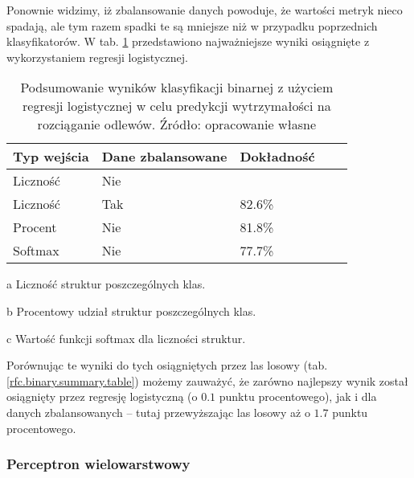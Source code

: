 Ponownie widzimy, iż zbalansowanie danych powoduje, że wartości metryk nieco spadają, ale tym razem spadki te są mniejsze niż w przypadku poprzednich klasyfikatorów. W tab. \ref{logit.binary.summary.table} przedstawiono najważniejsze wyniki osiągnięte z wykorzystaniem regresji logistycznej.
\begin{table}[!h]
	\centering
	\begin{threeparttable}
		\caption{Podsumowanie wyników klasyfikacji binarnej z użyciem regresji logistycznej w celu predykcji wytrzymałości na rozciąganie odlewów. Źródło: opracowanie własne}
		\label{logit.binary.summary.table}
		\begin{tabularx}{1\textwidth}{ |X|X|X|X|X| }
		  \hline
		  \textbf{Typ wejścia} & \textbf{Dane zbalansowane} & \textbf{Dokładność}\\

		  \hline
		  Liczność\tnote{a} & Nie  & \bo{83.1\%} \\

		  \hline
		  Liczność & Tak & 82.6\%\\

		  \hline
  		  Procent\tnote{b} & Nie & 81.8\%\\

	          \hline
  		  Softmax\tnote{c} & Nie & 77.7\%\\

		  \hline
		\end{tabularx}
		\begin{tablenotes}
			\footnotesize
			\item[a] Liczność struktur poszczególnych klas.
			\item[b] Procentowy udział struktur poszczególnych klas.
			\item[c] Wartość funkcji softmax dla liczności struktur.
		\end{tablenotes}
	\end{threeparttable}
\end{table}
Porównując te wyniki do tych osiągniętych przez las losowy (tab. \ref{rfc.binary.summary.table}) możemy zauważyć, że zarówno najlepszy wynik został osiągnięty przez regresję logistyczną (o $0.1$ punktu procentowego), jak i dla danych zbalansowanych – tutaj przewyższając las losowy aż o $1.7$ punktu procentowego. 

\subsubsection{Perceptron wielowarstwowy}
\label{structures.with.mlp}


